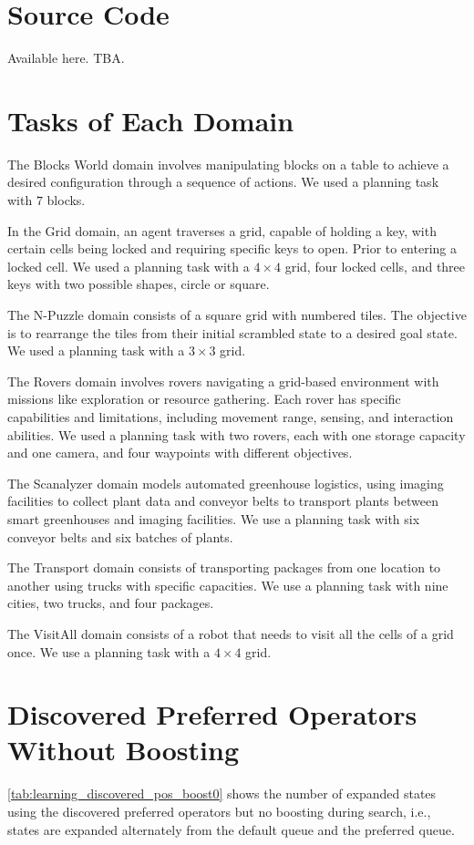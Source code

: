 \documentclass[ppgc,diss,english]{iiufrgs}
\begin{document}



\appendix


\chapter{Source Code}
Available here. TBA.

\chapter{Tasks of Each Domain}
\label{cha:tasks_each_domain}
The Blocks World domain involves manipulating blocks on a table to achieve a desired configuration through a sequence of actions. We used a planning task with $7$ blocks.

In the Grid domain, an agent traverses a grid, capable of holding a key, with certain cells being locked and requiring specific keys to open. Prior to entering a locked cell. We used a planning task with a $4 \times 4$ grid, four locked cells, and three keys with two possible shapes, circle or square.

The N-Puzzle domain consists of a square grid with numbered tiles. The objective is to rearrange the tiles from their initial scrambled state to a desired goal state. We used a planning task with a $3 \times 3$ grid.

The Rovers domain involves rovers navigating a grid-based environment with missions like exploration or resource gathering. Each rover has specific capabilities and limitations, including movement range, sensing, and interaction abilities. We used a planning task with two rovers, each with one storage capacity and one camera, and four waypoints with different objectives.

The Scanalyzer domain models automated greenhouse logistics, using imaging facilities to collect plant data and conveyor belts to transport plants between smart greenhouses and imaging facilities. We use a planning task with six conveyor belts and six batches of plants.

The Transport domain consists of transporting packages from one location to another using trucks with specific capacities. We use a planning task with nine cities, two trucks, and four packages.

The VisitAll domain consists of a robot that needs to visit all the cells of a grid once. We use a planning task with a $4 \times 4$ grid.


\chapter{Discovered Preferred Operators Without Boosting}
\label{cha:discovered_pos_boost0}
\cref{tab:learning_discovered_pos_boost0} shows the number of expanded states using the discovered preferred operators \pog but no boosting during search, i.e., states are expanded alternately from the default queue and the preferred queue.
\end{document}

